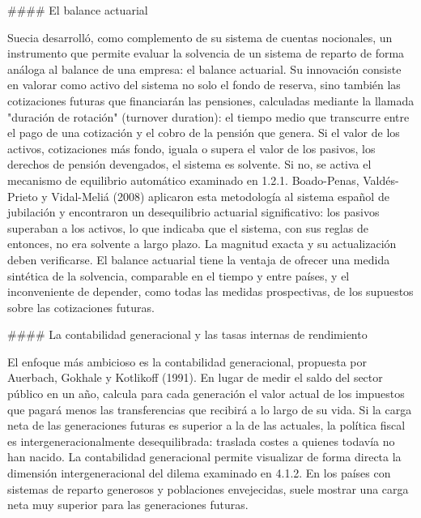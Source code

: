 \documentclass[10pt,a4paper]{article}
\begin{document}
#### El balance actuarial

Suecia desarrolló, como complemento de su sistema de cuentas nocionales, un instrumento que permite evaluar la solvencia de un sistema de reparto de forma análoga al balance de una empresa: el balance actuarial. Su innovación consiste en valorar como activo del sistema no solo el fondo de reserva, sino también las cotizaciones futuras que financiarán las pensiones, calculadas mediante la llamada "duración de rotación" (turnover duration): el tiempo medio que transcurre entre el pago de una cotización y el cobro de la pensión que genera. Si el valor de los activos, cotizaciones más fondo, iguala o supera el valor de los pasivos, los derechos de pensión devengados, el sistema es solvente. Si no, se activa el mecanismo de equilibrio automático examinado en 1.2.1. Boado-Penas, Valdés-Prieto y Vidal-Meliá (2008) aplicaron esta metodología al sistema español de jubilación y encontraron un desequilibrio actuarial significativo: los pasivos superaban a los activos, lo que indicaba que el sistema, con sus reglas de entonces, no era solvente a largo plazo. La magnitud exacta y su actualización deben verificarse. El balance actuarial tiene la ventaja de ofrecer una medida sintética de la solvencia, comparable en el tiempo y entre países, y el inconveniente de depender, como todas las medidas prospectivas, de los supuestos sobre las cotizaciones futuras.

#### La contabilidad generacional y las tasas internas de rendimiento

El enfoque más ambicioso es la contabilidad generacional, propuesta por Auerbach, Gokhale y Kotlikoff (1991). En lugar de medir el saldo del sector público en un año, calcula para cada generación el valor actual de los impuestos que pagará menos las transferencias que recibirá a lo largo de su vida. Si la carga neta de las generaciones futuras es superior a la de las actuales, la política fiscal es intergeneracionalmente desequilibrada: traslada costes a quienes todavía no han nacido. La contabilidad generacional permite visualizar de forma directa la dimensión intergeneracional del dilema examinado en 4.1.2. En los países con sistemas de reparto generosos y poblaciones envejecidas, suele mostrar una carga neta muy superior para las generaciones futuras.
\end{document}
